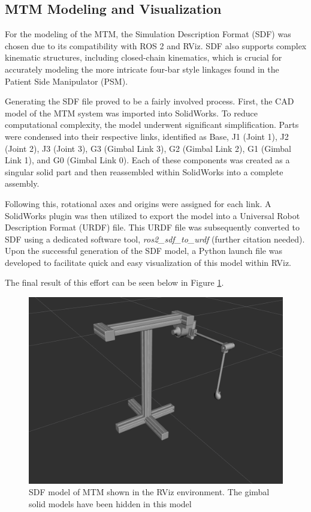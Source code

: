 \subsection{MTM Modeling and Visualization}

For the modeling of the MTM, the Simulation Description Format (SDF) was chosen due to its compatibility with ROS 2 and RViz. SDF also supports complex kinematic structures, including closed-chain kinematics, which is crucial for accurately modeling the more intricate four-bar style linkages found in the Patient Side Manipulator (PSM).

Generating the SDF file proved to be a fairly involved process. First, the CAD model of the MTM system was imported into SolidWorks. To reduce computational complexity, the model underwent significant simplification. Parts were condensed into their respective links, identified as Base, J1 (Joint 1), J2 (Joint 2), J3 (Joint 3), G3 (Gimbal Link 3), G2 (Gimbal Link 2), G1 (Gimbal Link 1), and G0 (Gimbal Link 0).
Each of these components was created as a singular solid part and then reassembled within SolidWorks into a complete assembly.

Following this, rotational axes and origins were assigned for each link. A SolidWorks plugin was then utilized to export the model into a Universal Robot Description Format (URDF) file. This URDF file was subsequently converted to SDF using a dedicated software tool, \textit{ros2\_sdf\_to\_urdf} (further citation needed). Upon the successful generation of the SDF model, a Python launch file was developed to facilitate quick and easy visualization of this model within RViz.

The final result of this effort can be seen below in Figure \ref{fig:mtm_sdf_model}.

\begin{figure}[H]
    \centering
    \includegraphics[width=0.9\linewidth]{figures/mtm_sdf_model.png}
    \caption{SDF model of MTM shown in the RViz environment. The gimbal solid models have been hidden in this model}
    \label{fig:mtm_sdf_model}
\end{figure}

